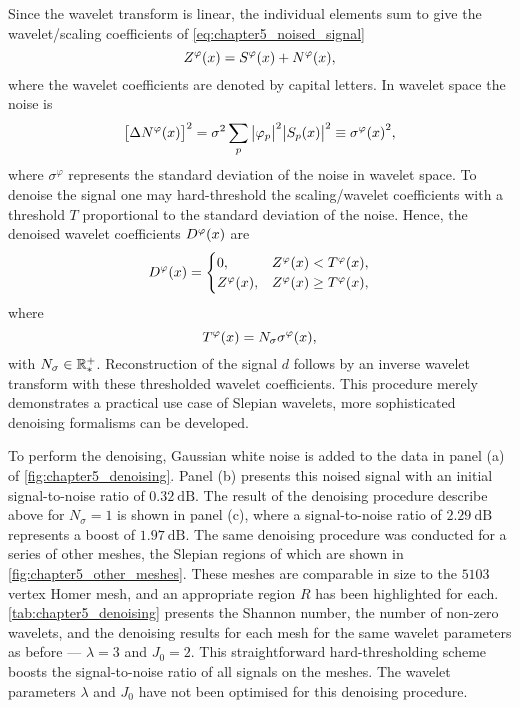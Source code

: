 Since the wavelet transform is linear, the individual elements sum to give the wavelet/scaling coefficients of \cref{eq:chapter5_noised_signal}
%
\begin{equation}
	Z^{\varphi}(x)
	= S^{\varphi}(x) + N^{\varphi}(x),
\end{equation}
%
where the wavelet coefficients are denoted by capital letters.
In wavelet space the noise is
%
\begin{equation}
	{\big[\Delta N^{\varphi}(x)\big]}^{2}
	= \sigma^{2} \sum\limits_{p} \big\lvert{\varphi}_{p}\big\rvert^{2} \big\lvert{S}_{p}(x)\big\rvert^{2}
	\equiv {\sigma^{\varphi}(x)}^{2},
\end{equation}
%
where \(\sigma^{\varphi}\) represents the standard deviation of the noise in wavelet space.
To denoise the signal one may hard-threshold the scaling/wavelet coefficients with a threshold \(T\) proportional to the standard deviation of the noise.
Hence, the denoised wavelet coefficients \(D^{\varphi}(x)\) are
%
\begin{equation}
	D^{\varphi}(x) =
	\begin{cases}
		0,
		 & Z^{\varphi}(x) < T^{\varphi}(x),    \\
		Z^{\varphi}(x),
		 & Z^{\varphi}(x) \geq T^{\varphi}(x),
	\end{cases}
\end{equation}
%
where
%
\begin{equation}
	T^{\varphi}(x)
	= N_{\sigma}\sigma^{\varphi}(x),
\end{equation}
%
with \(N_{\sigma} \in \mathbb{R}_{\ast}^{+}{}\).
Reconstruction of the signal \(d\) follows by an inverse wavelet transform with these thresholded wavelet coefficients.
This procedure merely demonstrates a practical use case of Slepian wavelets, more sophisticated denoising formalisms can be developed.

To perform the denoising, Gaussian white noise is added to the data in panel (a) of \cref{fig:chapter5_denoising}.
Panel (b) presents this noised signal with an initial signal-to-noise ratio of \(\SI{0.32}{\dB}\).
The result of the denoising procedure describe above for \(N_{\sigma}=1\) is shown in panel (c), where a signal-to-noise ratio of \(\SI{2.29}{\dB}\) represents a boost of \(\SI{1.97}{\dB}\).
The same denoising procedure was conducted for a series of other meshes, the Slepian regions of which are shown in \cref{fig:chapter5_other_meshes}.
These meshes are comparable in size to the \(\num{5103}\) vertex Homer mesh, and an appropriate region \(R\) has been highlighted for each.
\cref{tab:chapter5_denoising} presents the Shannon number, the number of non-zero wavelets, and the denoising results for each mesh for the same wavelet parameters as before --- \(\lambda=3\) and \(J_{0}=2\).
This straightforward hard-thresholding scheme boosts the signal-to-noise ratio of all signals on the meshes.
The wavelet parameters \(\lambda{}\) and \(J_{0}\) have not been optimised for this denoising procedure.

